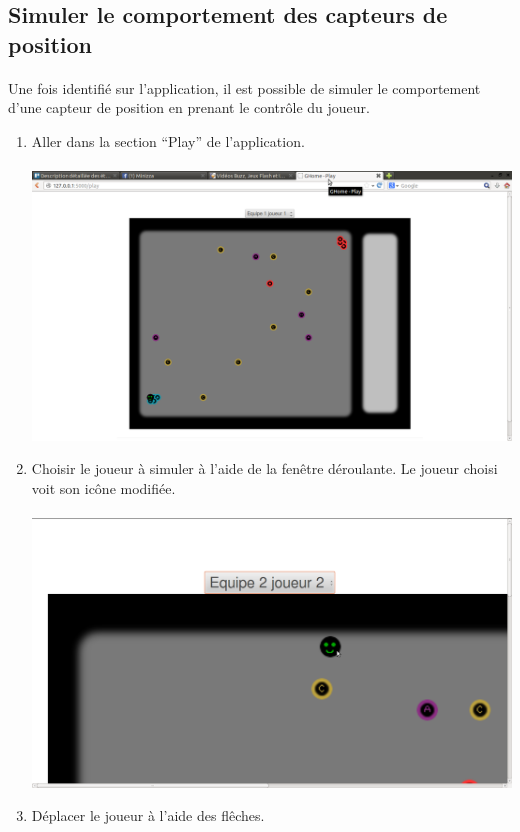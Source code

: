 \subsection{Simuler le comportement des capteurs de position}
\paragraph{} Une fois identifié sur l'application, il est possible de simuler le comportement d'une capteur de position en prenant le contrôle du joueur.\\

\begin{enumerate}
 \item Aller dans la section ``Play'' de l'application.\\
 ~~\\
 \includegraphics[scale=0.22]{image/surPlay}
 \item Choisir le joueur à simuler à l'aide de la fenêtre déroulante. Le joueur choisi voit son icône modifiée.\\
 ~~\\
  \includegraphics[scale=0.22]{image/listePlay}
 \item Déplacer le joueur à l'aide des flêches.\\
\end{enumerate}

